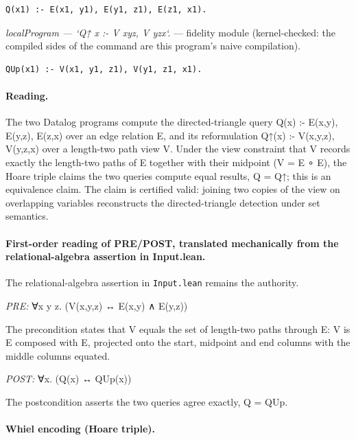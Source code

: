 \documentclass[10pt]{article}
\begin{document}
\begin{Verbatim}[fontsize=\scriptsize,breaklines=true,breakanywhere=true,frame=single,framesep=1.5mm]
Q(x1) :- E(x1, y1), E(y1, z1), E(z1, x1).
\end{Verbatim}

{\raggedright\textit{localProgram --- `Q↑ x :- V xyz, V yzx`.} --- fidelity module (kernel-checked: the compiled sides of the command are this program's naive compilation).\par}

\begin{Verbatim}[fontsize=\scriptsize,breaklines=true,breakanywhere=true,frame=single,framesep=1.5mm]
QUp(x1) :- V(x1, y1, z1), V(y1, z1, x1).
\end{Verbatim}

\paragraph{Reading.} The two Datalog programs compute the directed-triangle query Q(x) :- E(x,y), E(y,z), E(z,x) over an edge relation E, and its reformulation Q↑(x) :- V(x,y,z), V(y,z,x) over a length-two path view V. Under the view constraint that V records exactly the length-two paths of E together with their midpoint (V = E ∘ E), the Hoare triple claims the two queries compute equal results, Q = Q↑; this is an equivalence claim. The claim is certified valid: joining two copies of the view on overlapping variables reconstructs the directed-triangle detection under set semantics.

\paragraph{First-order reading of PRE/POST, translated mechanically from the relational-algebra assertion in Input.lean.} The relational-algebra assertion in \texttt{Input.lean} remains the authority.

\textit{PRE:} ∀x y z. (V(x,y,z) ↔ E(x,y) ∧ E(y,z))\par The precondition states that V equals the set of length-two paths through E: V is E composed with E, projected onto the start, midpoint and end columns with the middle columns equated.

\textit{POST:} ∀x. (Q(x) ↔ QUp(x))\par The postcondition asserts the two queries agree exactly, Q = QUp.

\paragraph{Whiel encoding (Hoare triple).}
\end{document}
